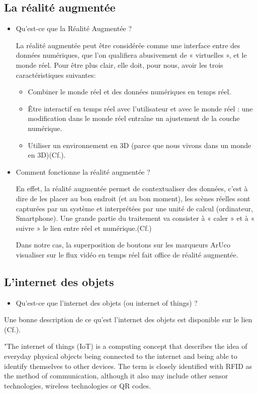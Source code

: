 \documentclass[12pt,a4paper]{article}
\begin{document}
\subsection{La réalité augmentée}
\begin{itemize}
\item Qu'est-ce que la Réalité Augmentée ? \par
La réalité augmentée peut être considérée comme une interface entre des données numériques, que l’on qualifiera abusivement de « virtuelles », et le monde réel. Pour être plus clair, elle doit, pour nous, avoir les trois caractéristiques suivantes:
  \begin{itemize}
\item Combiner le monde réel et des données numériques en temps réel.
\item Être interactif en temps réel avec l’utilisateur et avec le monde réel : une modification dans le monde réel entraîne un ajustement de la couche numérique.
\item Utiliser un environnement en 3D (parce que nous vivons dans un monde en 3D)(Cf.\cite{Ref17}).
\end{itemize}
\end{itemize}
\begin{itemize}
\item  Comment fonctionne la réalité augmentée ? \par
	En effet, la réalité augmentée permet de contextualiser des données, c’est à dire de les placer au bon endroit (et au bon moment), les scènes réelles sont capturées par un système et interprétées par une unité de calcul (ordinateur, Smartphone). Une grande partie du traitement va consister à « caler » et à « suivre » le lien entre réel et numérique.(Cf.\cite{Ref17})\par
   Dans notre cas, la superposition de boutons sur les marqueurs ArUco visualiser sur le flux vidéo en temps réel fait office de réalité augmentée.  
\end{itemize}

\subsection{L'internet des objets}
\begin{itemize}
\item Qu'est-ce que l'internet des objets (ou internet of things) ? \par
\end{itemize}
Une bonne description de ce qu'est l'internet des objets est disponible sur le lien (Cf.\cite{Ref27}).\par
"The internet of things (IoT) is a computing concept that describes the idea of everyday physical objects being connected to the internet and being able to identify themselves to other devices. The term is closely identified with RFID as the method of communication, although it also may include other sensor technologies, wireless technologies or QR codes.
\end{document}
